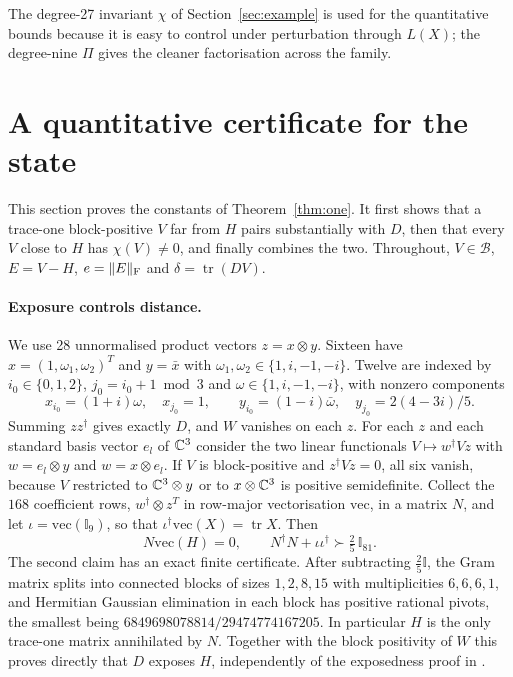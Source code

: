 \documentclass[11pt,a4paper]{article}
\theoremstyle{definition}\newtheorem{definition}[theorem]{Definition}\newtheorem*{conj}{Conjecture 9 of Shen, Chen and Bian}\newtheorem{remark}[theorem]{Remark}
\newcommand{\tr}{\operatorname{tr}}\newcommand{\im}{\operatorname{Im}}\newcommand{\adj}{\operatorname{adj}}\newcommand{\id}{\mathbb I}
\newcommand{\cB}{\mathcal B}\newcommand{\cR}{\mathcal R}\newcommand{\vecm}{\mathrm{vec}}
\begin{document}
The degree-27 invariant $\chi$ of Section~\ref{sec:example} is used for the quantitative bounds because it is easy to control under perturbation through $L(X)$; the degree-nine $\Pi$ gives the cleaner factorisation across the family.

\section{A quantitative certificate for the state}\label{sec:bounds}
This section proves the constants of Theorem~\ref{thm:one}. It first shows that a trace-one block-positive $V$ far from $H$ pairs substantially with $D$, then that every $V$ close to $H$ has $\chi(V)\neq0$, and finally combines the two. Throughout, $V\in\cB$, $E=V-H$, $e=\|E\|_\mathrm F$ and $\delta=\tr(DV)$.

\paragraph{Exposure controls distance.}
We use 28 unnormalised product vectors $z=x\otimes y$. Sixteen have $x=(1,\omega_1,\omega_2)^T$ and $y=\bar x$ with $\omega_1,\omega_2\in\{1,i,-1,-i\}$. Twelve are indexed by $i_0\in\{0,1,2\}$, $j_0=i_0+1\bmod3$ and $\omega\in\{1,i,-1,-i\}$, with nonzero components
\[
 x_{i_0}=(1+i)\omega,\quad x_{j_0}=1,\qquad
 y_{i_0}=(1-i)\bar\omega,\quad y_{j_0}=2(4-3i)/5 .
\]
Summing $zz^\dagger$ gives exactly $D$, and $W$ vanishes on each $z$. For each $z$ and each standard basis vector $e_l$ of $\mathbb C^3$ consider the two linear functionals $V\mapsto w^\dagger Vz$ with $w=e_l\otimes y$ and $w=x\otimes e_l$. If $V$ is block-positive and $z^\dagger Vz=0$, all six vanish, because $V$ restricted to $\mathbb C^3\otimes y$ or to $x\otimes\mathbb C^3$ is positive semidefinite. Collect the $168$ coefficient rows, $w^\dagger\otimes z^T$ in row-major vectorisation $\vecm$, in a matrix $N$, and let $\iota=\vecm(\id_9)$, so that $\iota^\dagger\vecm(X)=\tr X$. Then
\begin{equation}\label{eq:gram}
 N\vecm(H)=0,\qquad N^\dagger N+\iota\iota^\dagger\succ \tfrac25\,\id_{81}.
\end{equation}
The second claim has an exact finite certificate. After subtracting $\frac25\id$, the Gram matrix splits into connected blocks of sizes $1,2,8,15$ with multiplicities $6,6,6,1$, and Hermitian Gaussian elimination in each block has positive rational pivots, the smallest being $6849698078814/29474774167205$. In particular $H$ is the only trace-one matrix annihilated by $N$. Together with the block positivity of $W$ \cite[Theorem 2.2]{hk12} this proves directly that $D$ exposes $H$, independently of the exposedness proof in \cite{hakye}.
\end{document}
